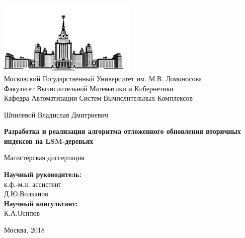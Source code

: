\documentclass[a4paper,hidelinks,12pt]{article}
\begin{document}
\begin {titlepage}
\thispagestyle{empty}

\begin{center}
\vspace{-1cm}

%
%
\includegraphics[width=0.5\textwidth]{msu}\\
Московский Государственный Университет им. М.В. Ломоносова\\
Факультет Вычислительной Математики и Кибернетики\\
Кафедра Автоматизации Систем Вычислительных Комплексов\\

\vspace{3cm}

{\Large Шпилевой Владислав Дмитриевич}

\vspace{1cm}

{\LARGE\bfseries Разработка и реализация алгоритма отложенного
обновления вторичных индексов на LSM-деревьях\\}

\vspace{1cm}

{\Large Магистерская диссертация}
\end{center}

\vfill

\begin{flushright}
\textbf {Научный руководитель:}\\
к.ф.-м.н. ассистент \\
Д.Ю.Волканов\\
\textbf {Научный консультант:}\\
К.А.Осипов\\
\vspace{10mm}
\end{flushright}

\vfill

\begin{center}
Москва, 2018
\end{center}

\end{titlepage}
\end{document}
